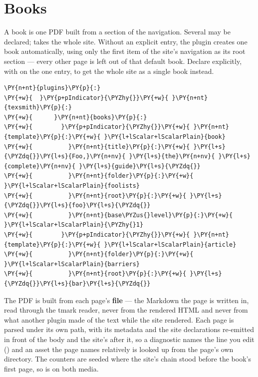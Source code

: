 \documentclass[a4paper,twoside]{article}
\begin{document}
\section{Books}
A book is one PDF built from a section of the navigation. Several may be
declared;  takes the whole site. Without
an explicit  entry, the plugin creates one book automatically, using
only the first item of the site's navigation as its root section --- every other
page is left out of that default book. Declare  explicitly, with
 on the one entry, to get the whole site
as a single book instead.
\begin{tscode}[lang=yaml, engine=pygments]
\begin{Verbatim}[commandchars=\\\{\},breaklines, breakanywhere, commandchars=\\\{\}]
\PY{n+nt}{plugins}\PY{p}{:}
\PY{+w}{  }\PY{p+pIndicator}{\PYZhy{}}\PY{+w}{ }\PY{n+nt}{texsmith}\PY{p}{:}
\PY{+w}{      }\PY{n+nt}{books}\PY{p}{:}
\PY{+w}{        }\PY{p+pIndicator}{\PYZhy{}}\PY{+w}{ }\PY{n+nt}{template}\PY{p}{:}\PY{+w}{ }\PY{l+lScalar+lScalarPlain}{book}
\PY{+w}{          }\PY{n+nt}{title}\PY{p}{:}\PY{+w}{ }\PY{l+s}{\PYZdq{}}\PY{l+s}{Foo,}\PY{n+nv}{ }\PY{l+s}{the}\PY{n+nv}{ }\PY{l+s}{complete}\PY{n+nv}{ }\PY{l+s}{guide}\PY{l+s}{\PYZdq{}}
\PY{+w}{          }\PY{n+nt}{folder}\PY{p}{:}\PY{+w}{ }\PY{l+lScalar+lScalarPlain}{foolists}
\PY{+w}{          }\PY{n+nt}{root}\PY{p}{:}\PY{+w}{ }\PY{l+s}{\PYZdq{}}\PY{l+s}{foo}\PY{l+s}{\PYZdq{}}
\PY{+w}{          }\PY{n+nt}{base\PYZus{}level}\PY{p}{:}\PY{+w}{ }\PY{l+lScalar+lScalarPlain}{\PYZhy{}1}
\PY{+w}{        }\PY{p+pIndicator}{\PYZhy{}}\PY{+w}{ }\PY{n+nt}{template}\PY{p}{:}\PY{+w}{ }\PY{l+lScalar+lScalarPlain}{article}
\PY{+w}{          }\PY{n+nt}{folder}\PY{p}{:}\PY{+w}{ }\PY{l+lScalar+lScalarPlain}{barriers}
\PY{+w}{          }\PY{n+nt}{root}\PY{p}{:}\PY{+w}{ }\PY{l+s}{\PYZdq{}}\PY{l+s}{bar}\PY{l+s}{\PYZdq{}}
\end{Verbatim}
\end{tscode}
The PDF is built from each page's \textbf{file} --- the Markdown the page is written
in, read through the tmark reader, never from the rendered HTML and never from
what another plugin made of the text while the site rendered. Each page is
parsed under its own path, with its metadata and the site declarations
re-emitted in front of the body and the site's  after it, so a
diagnostic names the line you edit () and an asset
the page names relatively is looked up from the page's own directory. The
counters are seeded where the site's chain stood before the book's first page,
so  is  on both media.
\end{document}

